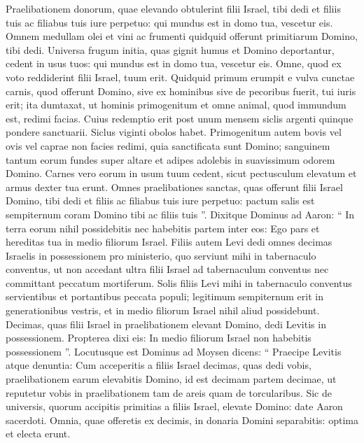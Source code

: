 \begin{biblechapter}
\begin{biblechapter}
\begin{biblechapter}
\begin{biblechapter}
\begin{biblechapter}
\begin{biblechapter}
\begin{biblechapter}
\begin{biblechapter}
\begin{biblechapter}
\begin{biblechapter}
\begin{biblechapter}
\begin{biblechapter}
\begin{biblechapter}
\begin{biblechapter}
\begin{biblechapter}
\begin{biblechapter}
\begin{biblechapter}
\begin{biblechapter}
 \verse Praelibationem donorum, quae elevando obtulerint filii Israel, tibi dedi et filiis tuis ac filiabus tuis iure perpetuo: qui mundus est in domo tua, vescetur eis. 
\verse Omnem medullam olei et vini ac frumenti quidquid offerunt primitiarum Domino, tibi dedi. 
\verse Universa frugum initia, quas gignit humus et Domino deportantur, cedent in usus tuos: qui mundus est in domo tua, vescetur eis. 
\verse Omne, quod ex voto reddiderint filii Israel, tuum erit. 
\verse Quidquid primum erumpit e vulva cunctae carnis, quod offerunt Domino, sive ex hominibus sive de pecoribus fuerit, tui iuris erit; ita dumtaxat, ut hominis primogenitum et omne animal, quod immundum est, redimi facias. 
\verse Cuius redemptio erit post unum mensem siclis argenti quinque pondere sanctuarii. Siclus viginti obolos habet. 
\verse Primogenitum autem bovis vel ovis vel caprae non facies redimi, quia sanctificata sunt Domino; sanguinem tantum eorum fundes super altare et adipes adolebis in suavissimum odorem Domino. 
\verse Carnes vero eorum in usum tuum cedent, sicut pectusculum elevatum et armus dexter tua erunt. 
\verse Omnes praelibationes sanctas, quas offerunt filii Israel Domino, tibi dedi et filiis ac filiabus tuis iure perpetuo: pactum salis est sempiternum coram Domino tibi ac filiis tuis ”.
 \verse Dixitque Dominus ad Aaron: “ In terra eorum nihil possidebitis nec habebitis partem inter eos: Ego pars et hereditas tua in medio filiorum Israel. 
\verse Filiis autem Levi dedi omnes decimas Israelis in possessionem pro ministerio, quo serviunt mihi in tabernaculo conventus, 
\verse ut non accedant ultra filii Israel ad tabernaculum conventus nec committant peccatum mortiferum. 
 \verse Solis filiis Levi mihi in tabernaculo conventus servientibus et portantibus peccata populi; legitimum sempiternum erit in generationibus vestris, et in medio filiorum Israel nihil aliud possidebunt. 
\verse Decimas, quas filii Israel in praelibationem elevant Domino, dedi Levitis in possessionem. Propterea dixi eis: In medio filiorum Israel non habebitis possessionem ”.
 \verse Locutusque est Dominus ad Moysen dicens: 
\verse “ Praecipe Levitis atque denuntia: Cum acceperitis a filiis Israel decimas, quas dedi vobis, praelibationem earum elevabitis Domino, id est decimam partem decimae, 
\verse ut reputetur vobis in praelibationem tam de areis quam de torcularibus. 
\verse Sic de universis, quorum accipitis primitias a filiis Israel, elevate Domino: date Aaron sacerdoti. 
\verse Omnia, quae offeretis ex decimis, in donaria Domini separabitis: optima et electa erunt.

\end{biblechapter}
\end{biblechapter}
\end{biblechapter}
\end{biblechapter}
\end{biblechapter}
\end{biblechapter}
\end{biblechapter}
\end{biblechapter}
\end{biblechapter}
\end{biblechapter}
\end{biblechapter}
\end{biblechapter}
\end{biblechapter}
\end{biblechapter}
\end{biblechapter}
\end{biblechapter}
\end{biblechapter}
\end{biblechapter}
